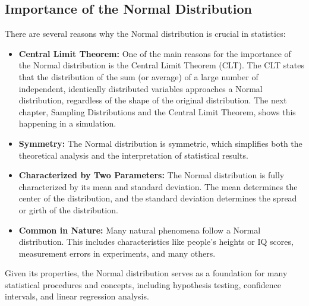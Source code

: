 \subsection{Importance of the Normal Distribution}
There are several reasons why the Normal distribution is crucial in statistics:

\begin{itemize}
\item \textbf{Central Limit Theorem:} One of the main reasons for the
  importance of the Normal distribution is the Central Limit Theorem
  (CLT). The CLT states that the distribution of the sum (or average)
  of a large number of independent, identically distributed variables
  approaches a Normal distribution, regardless of the shape of the
  original distribution. The next chapter, Sampling Distributions and the
  Central Limit Theorem, shows this happening in a simulation.

\item \textbf{Symmetry:} The Normal distribution is symmetric, which
  simplifies both the theoretical analysis and the interpretation of
  statistical results.

\item \textbf{Characterized by Two Parameters:} The Normal
  distribution is fully characterized by its mean and standard
  deviation. The mean determines the center of the distribution, and
  the standard deviation determines the spread or girth of the
  distribution.

\item \textbf{Common in Nature:} Many natural phenomena follow a
  Normal distribution. This includes characteristics like people's
  heights or IQ scores, measurement errors in experiments, and many
  others.
\end{itemize}

Given its properties, the Normal distribution serves as a foundation
for many statistical procedures and concepts, including hypothesis
testing, confidence intervals, and linear regression analysis.

